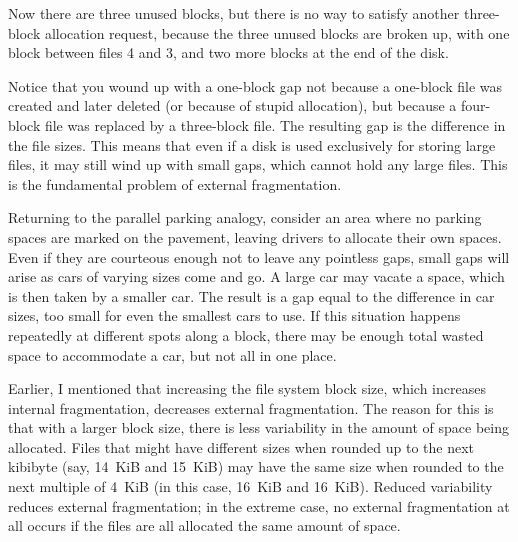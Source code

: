 Now there are three unused blocks, but there is no way to
satisfy another three-block allocation request, because the three
unused blocks are broken up, with one block between files 4 and 3, and
two more blocks at the end of the disk.

Notice that you wound up with a one-block gap not because a one-block
file was created and later deleted (or because of stupid allocation),
but because a four-block file was replaced by a three-block file.  The
resulting gap is the difference in the file sizes.  This means that
even if a disk is used exclusively for storing large files, it may
still wind up with small gaps, which cannot hold any large files.
This is the fundamental problem of external fragmentation.

Returning to the parallel parking analogy, consider an area where no
parking spaces are marked on the pavement, leaving drivers to allocate
their own spaces.  Even if they are courteous enough not to leave any
pointless gaps, small gaps will arise as cars of varying sizes come
and go.  A large car may vacate a space, which is then taken by a
smaller car.  The result is a gap equal to the difference in car
sizes, too small for even the smallest cars to use.  If this situation
happens repeatedly at different spots along a block, there may be enough
total wasted space to accommodate a car, but not all in one place.

Earlier, I mentioned that increasing the file system block size,
which increases internal fragmentation, decreases external
fragmentation.  The reason for this is that with a larger block size,
there is less variability in the amount of space being allocated.
Files that might have different sizes when rounded up to the next
kibibyte (say, 14~KiB and 15~KiB) may have the same size when rounded to
the next multiple of 4~KiB (in this case, 16~KiB and 16~KiB).  Reduced
variability reduces external fragmentation; in the extreme case, no
external fragmentation at all occurs if the files are all allocated
the same amount of space.

